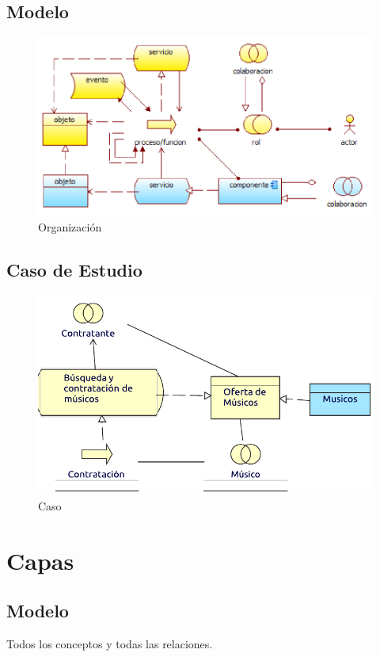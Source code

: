 \subsection{Modelo}
\begin{figure}[h!]
	\centering
	\includegraphics[width=\linewidth]{Arquitectura/Tecnologia/imgs/realizacionMetamodelo.PNG}
	\caption{Organización}
\end{figure}
\newpage
\subsection{Caso de Estudio}

\begin{figure}[hbt!]
	\centering
	\includegraphics[width=\linewidth]{Arquitectura/Tecnologia/imgs/realizacion.pdf}
	\caption{Caso}
\end{figure}

\newpage

\section{Capas}
\subsection{Modelo}
Todos los conceptos y todas las relaciones.
